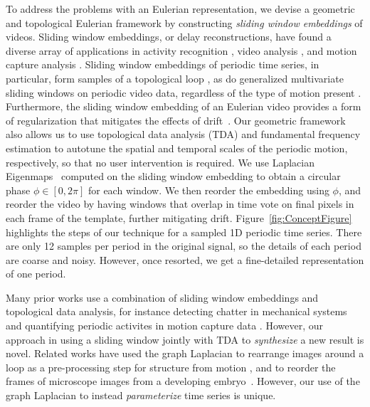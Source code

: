 \documentclass{article}
\begin{document}
To address the problems with an Eulerian representation, we devise a geometric and topological Eulerian framework by constructing {\em sliding window embeddings} of videos.  Sliding window embeddings, or delay reconstructions, have found a diverse array of applications in activity recognition \cite{frank2010activity,venkataraman2016shape}, video analysis \cite{tralie2017quasi}, and motion capture analysis \cite{venkataraman2016shape}.  Sliding window embeddings of periodic time series, in particular, form samples of a topological loop \cite{perea2015sliding}, as do generalized multivariate sliding windows on periodic video data, regardless of the type of motion present \cite{traliehigh, tralie2017quasi}.  Furthermore, the sliding window embedding of an Eulerian video provides a form of regularization that mitigates the effects of drift~\cite{tralie2017quasi}.  Our geometric framework also allows us to use topological data analysis (TDA) \cite{edelsbrunner2000topological,edelsbrunner2008persistent,edelsbrunner2010computational,carlsson2009topology,ghrist2014elementary} and fundamental frequency estimation \cite{Mcleod05asmarter} to autotune the spatial and temporal scales of the periodic motion, respectively, so that no user intervention is required.  We use Laplacian Eigenmaps~\cite{belkin2003laplacian} computed on the sliding window embedding to obtain a circular phase $\phi \in [0, 2\pi]$ for each window.  We then reorder the embedding using $\phi$, and reorder the video by having windows that overlap in time vote on final pixels in each frame of the template, further mitigating drift.  Figure~\ref{fig:ConceptFigure} highlights the steps of our technique for a sampled 1D periodic time series.  There are only 12 samples per period in the original signal, so the details of each period are coarse and noisy.  However, once resorted, we get a fine-detailed representation of one period.


Many prior works use a combination of sliding window embeddings and topological data analysis, for instance detecting chatter in mechanical systems \cite{khasawneh2016chatter} and quantifying periodic activites in motion capture data \cite{vejdemo2015cohomological, venkataraman2016persistent}. However, our approach in using a sliding window jointly with TDA to {\em synthesize} a new result is novel. Related works have used the graph Laplacian to rearrange images around a loop as a pre-processing step for structure from motion \cite{averbuch2015ringit}, and to reorder the frames of microscope images from a developing embryo~\cite{dsilva2015diffusionvecordering}.
However, our use of the graph Laplacian to instead {\em parameterize} time series is unique.
\end{document}
